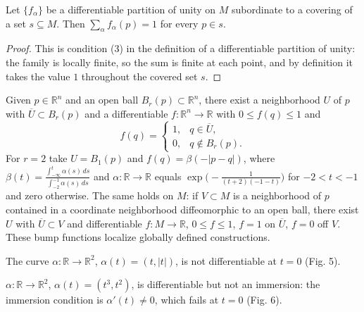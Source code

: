 \begin{lemma}
  \label{lem:dc-ch0-5-6-sum}


  Let $\{f_\alpha\}$ be a differentiable partition of unity on $M$ subordinate to a
  covering of a set $s\subseteq M$. Then $\sum_\alpha f_\alpha(p)=1$ for every
  $p\in s$.
\end{lemma}
\begin{proof}
  \sketch

  This is condition (3) in the definition of a differentiable partition of unity:
  the family is locally finite, so the sum is finite at each point, and by
  definition it takes the value $1$ throughout the covered set $s$.
\end{proof}

\begin{remark}
  \label{rem:dc-ch0-5-7}


  Given $p\in\mathbb{R}^n$ and an open ball $B_r(p)\subset\mathbb{R}^n$, there exist
  a neighborhood $U$ of $p$ with $\overline U\subset B_r(p)$ and a differentiable
  $f:\mathbb{R}^n\to\mathbb{R}$ with $0\le f(q)\le1$ and
  $$
  f(q)=\begin{cases}1,&q\in\overline U,\\ 0,&q\notin B_r(p).\end{cases}
  $$
  For $r=2$ take $U=B_1(p)$ and $f(q)=\beta(-|p-q|)$, where
  $\beta(t)=\frac{\int_{-\infty}^t\alpha(s)\,ds}{\int_{-2}^{-1}\alpha(s)\,ds}$ and
  $\alpha:\mathbb{R}\to\mathbb{R}$ equals $\exp\big(-\frac{1}{(t+2)(-1-t)}\big)$ for
  $-2<t<-1$ and zero otherwise. The same holds on $M$: if $V\subset M$ is a
  neighborhood of $p$ contained in a coordinate neighborhood diffeomorphic to an
  open ball, there exist $U$ with $\overline U\subset V$ and differentiable
  $f:M\to\mathbb{R}$, $0\le f\le1$, $f=1$ on $\overline U$, $f=0$ off $V$.
  These bump functions localize globally defined constructions.
\end{remark}

\begin{example}
  \label{ex:dc-ch0-3-2}


  The curve $\alpha:\mathbb{R}\to\mathbb{R}^2$, $\alpha(t)=(t,|t|)$, is not
  differentiable at $t=0$ (Fig. 5).
\end{example}

\begin{example}
  \label{ex:dc-ch0-3-3}


  $\alpha:\mathbb{R}\to\mathbb{R}^2$, $\alpha(t)=(t^3,t^2)$, is differentiable but
  not an immersion: the immersion condition is $\alpha'(t)\neq0$, which fails at
  $t=0$ (Fig. 6).
\end{example}

